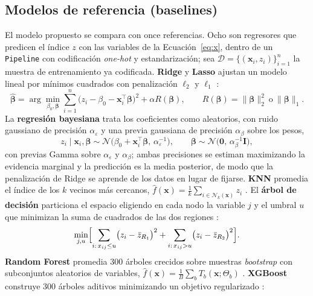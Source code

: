 \documentclass[pdflatex,sn-mathphys-num]{sn-jnl}
\theoremstyle{thmstyleone}
\begin{document}
\subsection{Modelos de referencia (baselines)}\label{subsec:sota}

El modelo propuesto se compara con once referencias. Ocho son regresores que predicen el índice $z$ con las variables de la Ecuación~\eqref{eq:x}, dentro de un \texttt{Pipeline} con codificación \emph{one-hot} y estandarización; sea $\mathcal{D}=\{(\mathbf{x}_i,z_i)\}_{i=1}^{n}$ la muestra de entrenamiento ya codificada. \textbf{Ridge} y \textbf{Lasso} ajustan un modelo lineal por mínimos cuadrados con penalización $\ell_2$ y $\ell_1$ \cite{hoerl1970,tibshirani1996}:
\begin{equation}
\hat{\boldsymbol{\beta}}=\arg\min_{\beta_0,\boldsymbol{\beta}}\sum_{i=1}^{n}\bigl(z_i-\beta_0-\mathbf{x}_i^{\top}\boldsymbol{\beta}\bigr)^2+\alpha R(\boldsymbol{\beta}),\qquad R(\boldsymbol{\beta})=\lVert\boldsymbol{\beta}\rVert_2^2\ \text{o}\ \lVert\boldsymbol{\beta}\rVert_1.
\label{eq:ridge}
\end{equation}
La \textbf{regresión bayesiana} \cite{mackay1992} trata los coeficientes como aleatorios, con ruido gaussiano de precisión $\alpha_\varepsilon$ y una previa gaussiana de precisión $\alpha_\beta$ sobre los pesos,
\begin{equation}
z_i\mid\mathbf{x}_i,\boldsymbol{\beta}\sim\mathcal{N}\bigl(\beta_0+\mathbf{x}_i^{\top}\boldsymbol{\beta},\,\alpha_\varepsilon^{-1}\bigr),\qquad \boldsymbol{\beta}\sim\mathcal{N}\bigl(\mathbf{0},\,\alpha_\beta^{-1}\mathbf{I}\bigr),
\label{eq:bayes}
\end{equation}
con previas Gamma sobre $\alpha_\varepsilon$ y $\alpha_\beta$; ambas precisiones se estiman maximizando la evidencia marginal y la predicción es la media posterior, de modo que la penalización de Ridge se aprende de los datos en lugar de fijarse.
\textbf{KNN} promedia el índice de los $k$ vecinos más cercanos, $\hat{f}(\mathbf{x})=\frac{1}{k}\sum_{i\in\mathcal{N}_k(\mathbf{x})}z_i$ \cite{cover1967}. El \textbf{árbol de decisión} particiona el espacio eligiendo en cada nodo la variable $j$ y el umbral $u$ que minimizan la suma de cuadrados de las dos regiones \cite{breiman1984}:
\begin{equation}
\min_{j,u}\Bigl[\sum_{i:\,x_{ij}\le u}\bigl(z_i-\bar{z}_{R_1}\bigr)^2+\sum_{i:\,x_{ij}>u}\bigl(z_i-\bar{z}_{R_2}\bigr)^2\Bigr].
\label{eq:arbol}
\end{equation}
\textbf{Random Forest} promedia 300 árboles crecidos sobre muestras \emph{bootstrap} con subconjuntos aleatorios de variables, $\hat{f}(\mathbf{x})=\frac{1}{B}\sum_{b}T_b(\mathbf{x};\Theta_b)$ \cite{breiman2001}. \textbf{XGBoost} construye 300 árboles aditivos minimizando un objetivo regularizado \cite{chen2016}:
\end{document}
